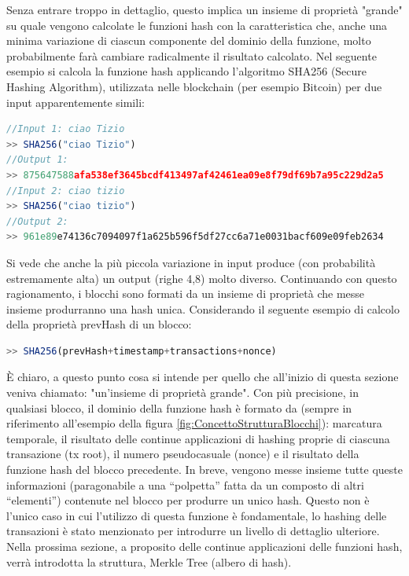 Senza entrare troppo in dettaglio, questo implica un insieme di proprietà "grande" su quale vengono calcolate le funzioni hash con la caratteristica che, anche una minima variazione di ciascun componente del dominio della funzione, molto probabilmente farà cambiare radicalmente il risultato calcolato.
Nel seguente esempio si calcola la funzione hash applicando l'algoritmo SHA256 (Secure Hashing Algorithm), utilizzata nelle blockchain (per esempio Bitcoin) per due input apparentemente simili: 

\begin{lstlisting}[caption={Esempio di calcolo della funzione hash SHA256},language=JavaScript]
//Input 1: ciao Tizio
>> SHA256("ciao Tizio")
//Output 1: 
>> 875647588afa538ef3645bcdf413497af42461ea09e8f79df69b7a95c229d2a5
//Input 2: ciao tizio
>> SHA256("ciao tizio")
//Output 2: 
>> 961e89e74136c7094097f1a625b596f5df27cc6a71e0031bacf609e09feb2634
\end{lstlisting}

Si vede che anche la più piccola variazione in input produce (con probabilità estremamente alta) un output (righe 4,8) molto diverso.
Continuando con questo ragionamento, i blocchi sono formati da un insieme di proprietà che messe insieme produrranno una hash unica. Considerando il seguente esempio di calcolo della proprietà prevHash di un blocco:

\begin{lstlisting}[caption={Esempio di calcolo della funzione hash in base alle proprietà del blocco},language=JavaScript]
>> SHA256(prevHash+timestamp+transactions+nonce)
\end{lstlisting}

È chiaro, a questo punto cosa si intende per quello che all'inizio di questa sezione veniva chiamato: "un'insieme di proprietà grande". Con più precisione, in qualsiasi blocco, il dominio della funzione hash è formato da (sempre in riferimento all'esempio della figura \ref{fig:ConcettoStrutturaBlocchi}): marcatura temporale, il risultato delle continue applicazioni di hashing proprie di ciascuna transazione (tx root), il numero pseudocasuale (nonce) e il risultato della funzione hash del blocco precedente. In breve, vengono messe insieme tutte queste informazioni (paragonabile a una “polpetta” fatta da un composto di altri “elementi”) contenute nel blocco per produrre un unico hash. Questo non è l'unico caso in cui l'utilizzo di questa funzione è fondamentale, lo hashing delle transazioni è stato menzionato per introdurre un livello di dettaglio ulteriore. Nella prossima sezione, a proposito delle continue applicazioni delle funzioni hash, verrà introdotta la struttura, Merkle Tree (albero di hash).

